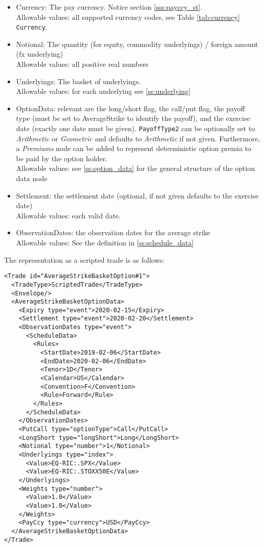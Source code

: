 \begin{itemize}
\item Currency: The pay currency. Notice section \ref{sss:payccy_st}. \\
  Allowable values: all supported currency codes, see Table \ref{tab:currency} \lstinline!Currency!.
\item Notional: The quantity (for equity, commodity underlyings) / foreign amount (fx underlying) \\
  Allowable values: all positive real numbers
\item Underlyings: The basket of underlyings. \\
  Allowable values: for each underlying see \ref{ss:underlying}
\item OptionData: relevant are the long/short flag, the call/put flag, the payoff type (must be set to AverageStrike to
  identify the payoff), and the exercise date (exactly one date must be given). \lstinline!PayoffType2! can be optionally set to \emph{Arithmetic} or \emph{Geometric} and defaults to \emph{Arithmetic} if not given. Furthermore, a \emph{Premiums} node can be added to represent deterministic option premia to be paid by the option holder. \\
  Allowable values: see \ref{ss:option_data} for the general structure of the option data node
\item Settlement: the settlement date (optional, if not given defaults to the exercise date) \\
  Allowable values: each valid date.
\item ObservationDates: the observation dates for the average strike \\
  Allowable values: See the definition in \ref{ss:schedule_data}
\end{itemize}

The representation as a scripted trade is as follows:

\begin{verbatim}
<Trade id="AverageStrikeBasketOption#1">
  <TradeType>ScriptedTrade</TradeType>
  <Envelope/>
  <AverageStrikeBasketOptionData>
    <Expiry type="event">2020-02-15</Expiry>
    <Settlement type="event">2020-02-20</Settlement>
    <ObservationDates type="event">
      <ScheduleData>
        <Rules>
          <StartDate>2019-02-06</StartDate>
          <EndDate>2020-02-06</EndDate>
          <Tenor>1D</Tenor>
          <Calendar>US</Calendar>
          <Convention>F</Convention>
          <Rule>Forward</Rule>
        </Rules>
      </ScheduleData>
    </ObservationDates>
    <PutCall type="optionType">Call</PutCall>
    <LongShort type="longShort">Long</LongShort>
    <Notional type="number">1</Notional>
    <Underlyings type="index">
      <Value>EQ-RIC:.SPX</Value>
      <Value>EQ-RIC:.STOXX50E</Value>
    </Underlyings>
    <Weights type="number">
      <Value>1.0</Value>
      <Value>1.0</Value>
    </Weights>
    <PayCcy type="currency">USD</PayCcy>
  </AverageStrikeBasketOptionData>
</Trade>
\end{verbatim}

